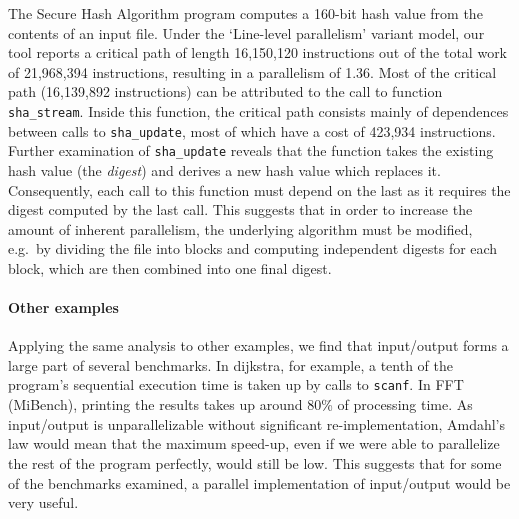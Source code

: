 The Secure Hash Algorithm program computes a 160-bit hash value from the contents of an input file.
Under the `Line-level parallelism' variant model, our tool reports a critical path of length 16,150,120 instructions out of the total work of 21,968,394 instructions, resulting in a parallelism of 1.36.
Most of the critical path (16,139,892 instructions) can be attributed to the call to function \texttt{sha\_stream}.
Inside this function, the critical path consists mainly of dependences between calls to \texttt{sha\_update}, most of which have a cost of 423,934 instructions.
Further examination of \texttt{sha\_update} reveals that the function takes the existing hash value (the \emph{digest}) and derives a new hash value which replaces it.
Consequently, each call to this function must depend on the last as it requires the digest computed by the last call.
This suggests that in order to increase the amount of inherent parallelism, the underlying algorithm must be modified, e.g.\ by dividing the file into blocks and computing independent digests for each block, which are then combined into one final digest.

\paragraph{Other examples}

Applying the same analysis to other examples, we find that input/output forms a large part of several benchmarks.
In \textsf{dijkstra}, for example, a tenth of the program's sequential execution time is taken up by calls to \texttt{scanf}.
In \textsf{FFT} (MiBench), printing the results takes up around 80\% of processing time.
As input/output is unparallelizable without significant re-implementation, Amdahl's law would mean that the maximum speed-up, even if we were able to parallelize the rest of the program perfectly, would still be low.
This suggests that for some of the benchmarks examined, a parallel implementation of input/output would be very useful.










































